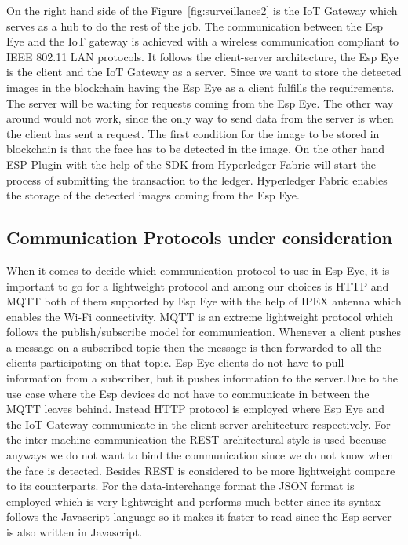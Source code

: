 On the right hand side of the Figure~\ref{fig:surveillance2} is the IoT Gateway which serves as a hub to do the rest of the job. The communication between the Esp Eye and the IoT gateway is achieved with a wireless communication compliant to IEEE 802.11 LAN protocols. It follows the client-server architecture, the Esp Eye is the client and the IoT Gateway as a server. Since we want to store the detected images in the blockchain having the Esp Eye as a client fulfills the requirements. The server will be waiting for requests coming from the Esp Eye. The other way around would not work, since the only way to send data from the server is when the client has sent a request. The first condition for the image to be stored in blockchain is that the face has to be detected in the image. On the other hand ESP Plugin with the help of the SDK from Hyperledger Fabric will start the process of submitting the transaction to the ledger. Hyperledger Fabric enables the storage of the detected images coming from the Esp Eye.   

\subsection{Communication Protocols under consideration}
When it comes to decide which communication protocol to use in Esp Eye, it is important to go for a lightweight protocol and among our choices is HTTP and MQTT both of them supported by Esp Eye with the help of IPEX antenna which enables the Wi-Fi connectivity. MQTT is an extreme lightweight protocol which follows the publish/subscribe model for communication. Whenever a client pushes a message on a subscribed topic then the message is then forwarded to all the clients participating on that topic. Esp Eye clients do not have to pull information from a subscriber, but it pushes information to the server.Due to the use case where the Esp devices do not have to communicate in between the MQTT leaves behind. 
Instead HTTP protocol is employed where Esp Eye and the IoT Gateway communicate in the client server architecture respectively. For the inter-machine communication the REST architectural style is used because anyways we do not want to bind the communication since we do not know when the face is detected. Besides REST is considered to be more lightweight compare to its counterparts. For the data-interchange format the JSON format is employed which is very lightweight and performs much better since its syntax follows the Javascript language so it makes it faster to read since the Esp server is also written in Javascript.  
